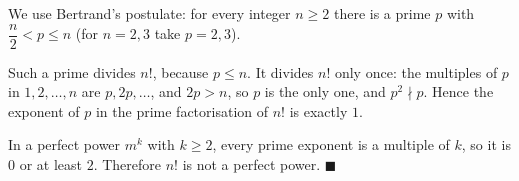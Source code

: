 We use Bertrand's postulate: for every integer $n\ge2$ there is a prime $p$ with $\dfrac {n}{2}<p\le n$ (for $n=2,3$ take $p=2,3$).

Such a prime divides $n!$, because $p\le n$. It divides $n!$ only once: the multiples of $p$ in $1,2,\dots,n$ are $p,2p,\dots$, and $2p>n$, so $p$ is the only one, and $p^2\nmid p$. Hence the exponent of $p$ in the prime factorisation of $n!$ is exactly $1$.

In a perfect power $m^k$ with $k\ge2$, every prime exponent is a multiple of $k$, so it is $0$ or at least $2$. Therefore $n!$ is not a perfect power. $\blacksquare$
